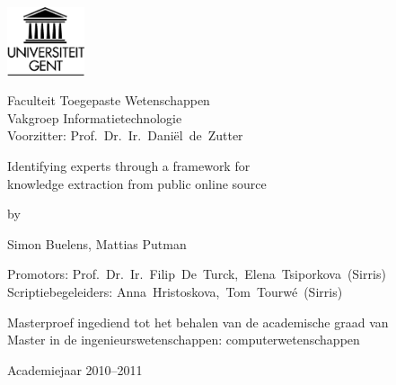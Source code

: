 

\begin{titlepage}

\setlength{\hoffset}{-1in}
\setlength{\voffset}{-1in}
\setlength{\topmargin}{1.5cm}
\setlength{\headheight}{0.5cm}
\setlength{\headsep}{1cm}
\setlength{\oddsidemargin}{3cm}
\setlength{\evensidemargin}{3cm}
\setlength{\footskip}{1.5cm}
\enlargethispage{1cm}

\fontsize{12pt}{14pt}
\selectfont

\begin{center}

\includegraphics[height=2cm]{fig/ruglogo}

\vspace{0.5cm}

Faculteit Toegepaste Wetenschappen\\
Vakgroep Informatietechnologie\\
Voorzitter: Prof.~Dr.~Ir.~Dani\"{e}l~de~Zutter

\vspace{3.5cm}

\fontsize{17.28pt}{21pt}
\selectfont

Identifying experts through a framework for\\
knowledge extraction from public online source

\fontsize{12pt}{14pt}
\selectfont

\vspace{.6cm}

by 

\vspace{.4cm}

Simon Buelens, Mattias Putman

\vspace{3.5cm}

Promotors: Prof.~Dr.~Ir.~Filip~De~Turck,~Elena~Tsiporkova~(Sirris)\\
Scriptiebegeleiders: Anna~Hristoskova,~Tom~Tourw\'{e}~(Sirris)\\

\vspace{2cm}

Masterproef ingediend tot het behalen van de academische graad van\\
Master in de ingenieurswetenschappen: computerwetenschappen

\vspace{1cm}

Academiejaar 2010--2011

\end{center}
\end{titlepage}
